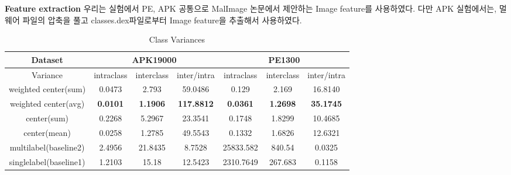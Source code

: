 \textbf{Feature extraction}
우리는 실험에서 PE, APK 공통으로 MalImage 논문에서 제안하는 Image feature를 사용하였다. 다만 APK 실험에서는, 멀웨어 파일의 압축을 풀고 classes.dex파일로부터 Image feature을 추출해서 사용하였다.  

\begin{table*}[!htb]%
\caption{Class Variances}
\label{tab:class_variances}
\begin{minipage}{\textwidth}
\begin{center}
\begin{tabular}{|c|c|c|c|c|c|c|}
\hline
Dataset             & \multicolumn{3}{c|}{APK19000}                               & \multicolumn{3}{c|}{PE1300}                                             \\ \hline
Variance              & intraclass  & interclass  & inter/intra & intraclass  & interclass  & inter/intra  \\ \hline
weighted center(sum)  & 0.0473              &         2.793       &     59.0486             & 0.129               &              2.169 &              16.8140    \\ \hline
weighted center(avg) & \textbf{0.0101}              &          \textbf{    1.1906} &    \textbf{117.8812 }            & \textbf{0.0361             } &                   \textbf{ 1.2698} &      \textbf{35.1745}                   \\ \hline
center(sum)         & 0.2268              &                    5.2967 &          23.3541               & 0.1748              &              1.8299       &    10.4685                     \\ \hline
center(mean)        & 0.0258              &                    1.2785 &           49.5543              & 0.1332              &        1.6826             &     12.6321                    \\ \hline
multilabel(baseline2)               & 2.4956              &                    21.8435 &       8.7528                    & 25833.582           &        840.54             &        0.0325               \\ \hline
singlelabel(baseline1)              & 1.2103              &                    15.18 &            12.5423             & 2310.7649           &      267.683               &           0.1158              \\ \hline
\end{tabular}
\end{center}
\bigskip\centering
\end{minipage}
\end{table*}%


